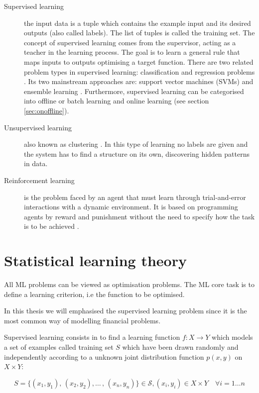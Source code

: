 \begin{description}
\item[Supervised learning]  the input data is a tuple which contains the example input and its desired outputs (also called labels). The list of tuples is called the training set. The concept of supervised learning comes from the supervisor, acting as a teacher in the learning process. The goal is to learn a general rule that maps inputs to outputs optimising a target function. There are two related problem types in supervised learning: classification and regression problems \cite{bishop2006}. Its two mainstream approaches are: support vector machines (SVMs) \cite{vapnik1998} and ensemble learning \cite{breiman1998}. Furthermore, supervised learning can be categorised into offline or batch learning and online learning (see section \ref{sec:onoffline}). 
\item[Unsupervised learning] also known as clustering \cite{ben2005}. In this type of learning no labels are given and the system has to find a structure on its own, discovering hidden patterns in data.
\item[Reinforcement learning] is the problem faced by an agent that must learn 
through trial-and-error interactions with a dynamic environment. It is based on programming agents by reward and punishment without the need to specify how the task is to be achieved \cite{sutton1998}.
\end{description}


\section{Statistical learning theory} \label{sec:mltheory}

All ML problems can be viewed as optimisation problems. The ML core task is to define a learning criterion, i.e the function to be optimised. 

In this thesis we will emphasised the supervised learning problem since it is the most common way of modelling financial problems.

Supervised learning consists in to find a learning function $f: X \rightarrow Y$ which models a set of examples called training set $S$ which have been drawn randomly and independently according to a unknown joint distribution function $p(x,y)$ on $X \times Y$:


$$
S= \{(x_1,y_1),\,(x_2,y_2),\dots\,,\,(x_n,y_n)\} \in \mathcal{S}, (x_i,y_i) \in X\times Y \quad \forall i = 1\dots n
$$


